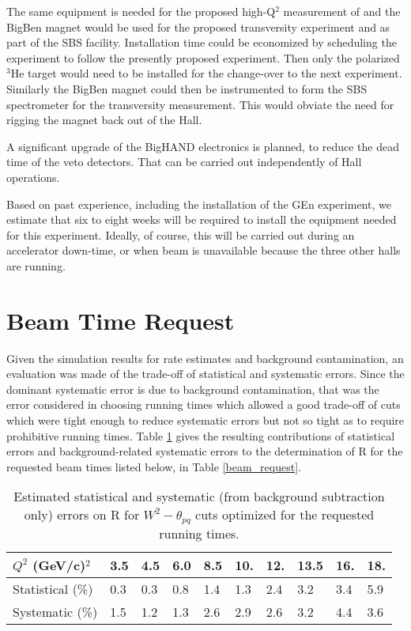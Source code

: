 \documentclass[12pt,letterpaper,oneside]{article}
\begin{document}
The same equipment is needed for the proposed high-Q$^2$ measurement of 
\genc\cite{new_GEN} and the BigBen magnet would be used for the
proposed transversity experiment and as part of the SBS facility.
Installation time could be economized by scheduling the \gen
experiment to follow the presently proposed experiment.  Then only the
polarized $^3$He target would need to be installed for the change-over
to the next experiment. Similarly the BigBen magnet could then be
instrumented to form the SBS spectrometer for the transversity
measurement.  This would obviate the need for rigging the magnet back
out of the Hall.

A significant upgrade of the
BigHAND electronics is planned, to reduce the dead time of the veto
detectors.  That can be carried out independently of Hall operations.

Based on past experience, including the installation of the GEn
experiment, we estimate that six to eight weeks will be required to
install the equipment needed for this experiment.  Ideally, of course,
this will be carried out during an accelerator down-time, or when beam
is unavailable because the three other halls are running.



\section{Beam Time Request}

Given the simulation results for rate estimates and background
contamination, an evaluation was made of the trade-off of statistical
and systematic errors.  Since the dominant systematic error is due to
background contamination, that was the error considered in choosing
running times which allowed a good trade-off of cuts which were tight
enough to reduce systematic errors but not so tight as to require
prohibitive running times.  Table \ref{R_stat_syst} gives the
resulting contributions of statistical errors and background-related
systematic errors to the determination of R for the  requested
beam times listed below, in Table \ref{beam_request}.  

\begin{table}
\begin{center}
\caption{
Estimated statistical and systematic (from background subtraction
only) errors on R for $W^2-\theta_{pq}$ cuts optimized for the requested
running times.
\label{R_stat_syst}}
\vspace{.2in}
{\begin{tabular}{|l|l|l|l|l|l|l|l|l|l|}
\hline
$Q^2$ (GeV/c)$^2$&3.5& 4.5&6.0& 8.5&10.&12.&13.5&16.&18.\\
\hline
\hline
Statistical (\%)&0.3&0.3&0.8&1.4&1.3&2.4&3.2&3.4&5.9\\
\hline
Systematic (\%)&1.5&1.2&1.3&2.6&2.9&2.6&3.2&4.4&3.6\\
\hline
\end{tabular}}
\end{center}
\end{table}
\end{document}
